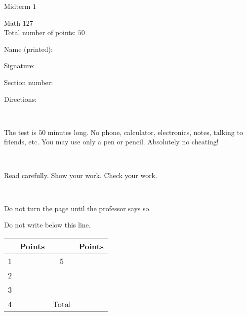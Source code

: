 \documentclass{article}
\begin{document}
\renewcommand{\headrulewidth}{0pt}
\fontsize{11}{18}\selectfont
\begin{center}
\begin{bfseries}
\noindent \Large{Midterm $1$} \\ 
\end{bfseries} 
\vspace{0.3cm}
\large{Math 127} \\
\large{Total number of points: $50$}
\end{center}

\begin{center}
Name (printed): \underline{\hspace{4in}}
 

 
Signature: \underline{\hspace{4in}}
 

 
Section number: \underline{\hspace{1in}}
 
 
\end{center}

\normalsize

\vfill

Directions:

\

The test is $50$ minutes long. No phone, calculator, electronics, notes, talking to friends, etc. You may use only a pen or pencil. Absolutely no cheating!

\


Read carefully. Show your work. Check your work.

\

Do not turn the page until the professor says so.
\vfill

\large
Do not write below this line. 


\noindent\makebox[\linewidth]{\rule{\paperwidth}{0.4pt}}

\vfill

\huge
{%
\begin{center}
\begin{tabular}{| c | c | c | c |}
\hline
  & Points &  & Points \\ \hline
1 &  & 5 & \\ \hline
2 &  &  & \\ \hline
3 &  &  & \\ \hline
4 &  & Total & \\ \hline 
\end{tabular}
\end{center}
}%
\end{document}
